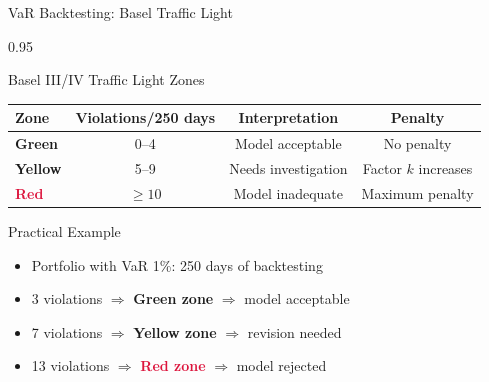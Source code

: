 \documentclass[9pt, aspectratio=169, t]{beamer}
\begin{document}
\begin{frame}{VaR Backtesting: Basel Traffic Light}
    \begin{cminipage}{0.95\textwidth}
    \small
    \begin{block}{Basel III/IV Traffic Light Zones}
        \begin{center}
            \begin{tabular}{lccc}
                \toprule
                \textbf{Zone} & \textbf{Violations/250 days} & \textbf{Interpretation} & \textbf{Penalty} \\
                \midrule
                \cellcolor{Forest!15}\textcolor{Forest}{\textbf{Green}} & 0--4 & Model acceptable & No penalty \\
                \cellcolor{Amber!15}\textcolor{Amber}{\textbf{Yellow}} & 5--9 & Needs investigation & Factor $k$ increases \\
                \cellcolor{Crimson!15}\textcolor{Crimson}{\textbf{Red}} & $\geq 10$ & Model inadequate & Maximum penalty \\
                \bottomrule
            \end{tabular}
        \end{center}
    \end{block}

    \vspace{0.2cm}

    \begin{exampleblock}{Practical Example}
        \begin{itemize}\setlength{\itemsep}{0pt}
            \item Portfolio with VaR 1\%: 250 days of backtesting
            \item 3 violations $\Rightarrow$ \textcolor{Forest}{\textbf{Green zone}} $\Rightarrow$ model acceptable
            \item 7 violations $\Rightarrow$ \textcolor{Amber}{\textbf{Yellow zone}} $\Rightarrow$ revision needed
            \item 13 violations $\Rightarrow$ \textcolor{Crimson}{\textbf{Red zone}} $\Rightarrow$ model rejected
        \end{itemize}
    \end{exampleblock}
    \end{cminipage}
\end{frame}
\end{document}
